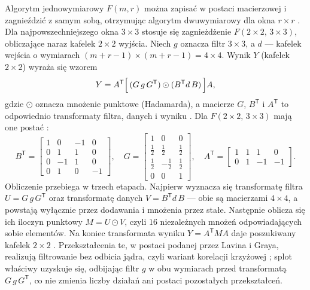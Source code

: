 \documentclass[a4paper,12pt]{book} %
\begin{document}
Algorytm jednowymiarowy $F(m, r)$ można zapisać w postaci macierzowej i zagnieździć z samym sobą, otrzymując algorytm dwuwymiarowy dla okna $r \times r$ \cite{lavin2016fast}. Dla najpowszechniejszego okna $3 \times 3$ stosuje się zagnieżdżenie $F(2 \times 2,\, 3 \times 3)$, obliczające naraz kafelek $2 \times 2$ wyjścia. Niech $g$ oznacza filtr $3 \times 3$, a $d$ --- kafelek wejścia o wymiarach $(m + r - 1) \times (m + r - 1) = 4 \times 4$. Wynik $Y$ (kafelek $2 \times 2$) wyraża się wzorem
\[
  Y = A^{\mathsf{T}}\Bigl[\, (G\, g\, G^{\mathsf{T}}) \odot (B^{\mathsf{T}} d\, B) \,\Bigr] A,
\]
gdzie $\odot$ oznacza mnożenie punktowe (Hadamarda), a macierze $G$, $B^{\mathsf{T}}$ i $A^{\mathsf{T}}$ to odpowiednio transformaty filtra, danych i wyniku \cite{lavin2016fast}. Dla $F(2 \times 2,\, 3 \times 3)$ mają one postać \cite{lavin2016fast}:
\[
  B^{\mathsf{T}} = \begin{bmatrix}
    1 & 0 & -1 & 0 \\
    0 & 1 & 1 & 0 \\
    0 & -1 & 1 & 0 \\
    0 & 1 & 0 & -1
  \end{bmatrix}, \quad
  G = \begin{bmatrix}
    1 & 0 & 0 \\[2pt]
    \tfrac{1}{2} & \tfrac{1}{2} & \tfrac{1}{2} \\[2pt]
    \tfrac{1}{2} & -\tfrac{1}{2} & \tfrac{1}{2} \\[2pt]
    0 & 0 & 1
  \end{bmatrix}, \quad
  A^{\mathsf{T}} = \begin{bmatrix}
    1 & 1 & 1 & 0 \\
    0 & 1 & -1 & -1
  \end{bmatrix}.
\]
Obliczenie przebiega w trzech etapach. Najpierw wyznacza się transformatę filtra $U = G\, g\, G^{\mathsf{T}}$ oraz transformatę danych $V = B^{\mathsf{T}} d\, B$ --- obie są macierzami $4 \times 4$, a powstają wyłącznie przez dodawania i mnożenia przez stałe. Następnie oblicza się ich iloczyn punktowy $M = U \odot V$, czyli $16$ niezależnych mnożeń odpowiadających sobie elementów. Na koniec transformata wyniku $Y = A^{\mathsf{T}} M A$ daje poszukiwany kafelek $2 \times 2$ \cite{lavin2016fast}. Przekształcenia te, w postaci podanej przez Lavina i Graya, realizują filtrowanie bez odbicia jądra, czyli wariant korelacji krzyżowej \cite{lavin2016fast}; splot właściwy uzyskuje się, odbijając filtr $g$ w obu wymiarach przed transformatą $G\, g\, G^{\mathsf{T}}$, co nie zmienia liczby działań ani postaci pozostałych przekształceń.
\end{document}
